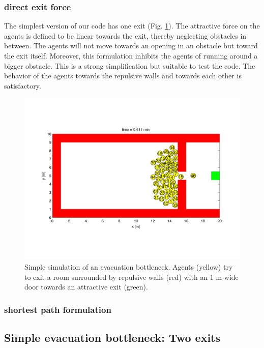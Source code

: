 \documentclass[11pt]{article}
\begin{document}
\subsubsection{direct exit force}

The simplest version of our code has one exit (Fig. \ref{fig:test1}). The attractive force on the agents is defined to be linear towards the exit, thereby neglecting obstacles in between. The agents will not move towards an opening in an obstacle but toward the exit itself. Moreover, this formulation inhibits the agents of running around a bigger obstacle. This is a strong simplification but suitable to test the code.
The behavior of the agents towards the repulsive walls and towards each other is satisfactory.

\begin{figure}
	\begin{center}
	\includegraphics[width=16cm]{figures/test1000493.jpg}
	\caption{Simple simulation of an evacuation bottleneck. Agents (yellow) try to exit a room surrounded by repulsive walls (red) with an 1 m-wide door towards an attractive exit (green).}
	\label{fig:test1}
	\end{center}
\end{figure}

\subsubsection{shortest path formulation}

\subsection{Simple evacuation bottleneck: Two exits}
\end{document}
